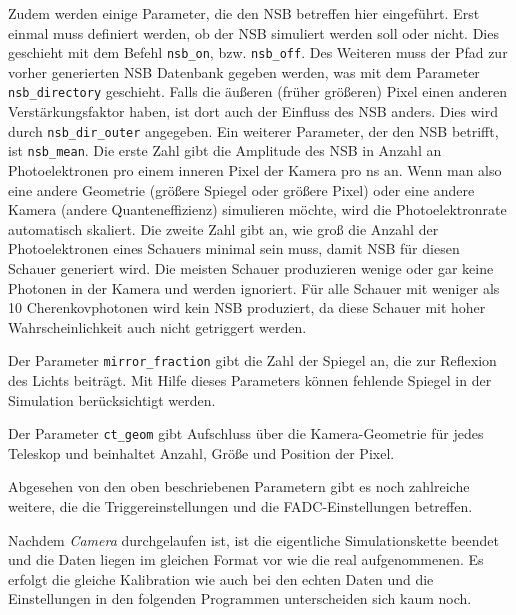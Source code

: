 Zudem werden einige Parameter, die den NSB betreffen hier eingeführt.
Erst einmal muss definiert werden, ob der NSB simuliert werden soll oder nicht. 
Dies geschieht mit dem Befehl \texttt{nsb\_on}, bzw. \texttt{nsb\_off}.
Des Weiteren muss der Pfad zur vorher generierten NSB Datenbank gegeben werden, was mit dem Parameter \texttt{nsb\_directory} geschieht.
Falls die äußeren (früher größeren) Pixel einen anderen Verstärkungsfaktor haben, ist dort auch der Einfluss des NSB anders. 
Dies wird durch \texttt{nsb\_dir\_outer} angegeben.
Ein weiterer Parameter, der den NSB betrifft, ist \texttt{nsb\_mean}.
Die erste Zahl gibt die Amplitude des NSB in Anzahl an Photoelektronen pro einem inneren Pixel der Kamera pro ns an.
Wenn man also eine andere Geometrie (größere Spiegel oder größere Pixel) oder eine andere Kamera (andere Quanteneffizienz) simulieren möchte, wird die Photoelektronrate automatisch skaliert.
Die zweite Zahl gibt an, wie groß die Anzahl der Photoelektronen eines Schauers minimal sein muss, damit NSB für diesen Schauer generiert wird.
Die meisten Schauer produzieren wenige oder gar keine Photonen in der Kamera und werden ignoriert.
Für alle Schauer mit weniger als 10 Cherenkovphotonen wird kein NSB produziert, da diese Schauer mit hoher Wahrscheinlichkeit auch nicht getriggert werden.

Der Parameter \texttt{mirror\_fraction} gibt die Zahl der Spiegel an, die zur Reflexion des Lichts beiträgt. 
Mit Hilfe dieses Parameters können fehlende Spiegel in der Simulation berücksichtigt werden.

Der Parameter \texttt{ct\_geom} gibt Aufschluss über die Kamera-Geometrie für jedes Teleskop und beinhaltet Anzahl, Größe und Position der Pixel.

Abgesehen von den oben beschriebenen Parametern gibt es noch zahlreiche weitere, die die Triggereinstellungen und die FADC-Einstellungen betreffen.

Nachdem \textit{Camera} durchgelaufen ist, ist die eigentliche Simulationskette beendet und die Daten liegen im gleichen Format vor wie die real aufgenommenen.
Es erfolgt die gleiche Kalibration wie auch bei den echten Daten und die Einstellungen in den folgenden Programmen unterscheiden sich kaum noch.

